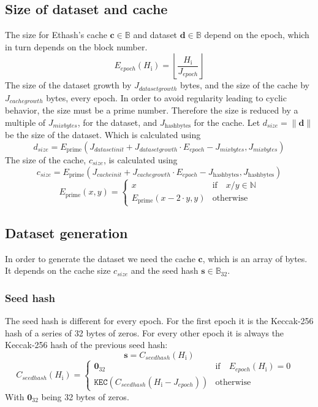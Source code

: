 \documentclass[9pt,oneside]{amsart}
\makeatletter
\newcommand{\linkdest}[1]{\Hy@raisedlink{\hypertarget{#1}{}}}
\makeatother
\begin{document}
\subsection{Size of dataset and cache}
The size for Ethash's cache $\mathbf{c} \in \mathbb{B}$  and dataset $\mathbf{d} \in \mathbb{B}$ depend on the epoch, which in turn depends on the block number.
\begin{equation}
 E_{epoch}(H_{\mathrm{i}}) = \left\lfloor\frac{H_{\mathrm{i}}}{J_{epoch}}\right\rfloor
\end{equation}
The size of the dataset growth by $J_{datasetgrowth}$ bytes, and the size of the cache by $J_{cachegrowth}$ bytes, every epoch. In order to avoid regularity leading to cyclic behavior, the size must be a prime number. Therefore the size is reduced by a multiple of $J_{mixbytes}$, for the dataset, and $J_{\mathrm{hashbytes}}$ for the cache.
\linkdest{d__size}{}Let $d_{size} = \lVert \mathbf{d} \rVert$ be the size of the dataset. Which is calculated using
\begin{equation}
 d_{size} = E_{\mathrm{prime}}(J_{datasetinit} + J_{datasetgrowth} \cdot E_{epoch} - J_{mixbytes}, J_{mixbytes})
\end{equation}
The size of the cache, $c_{size}$, is calculated using
\begin{equation}
 c_{size} = E_{\mathrm{prime}}(J_{cacheinit} + J_{cachegrowth} \cdot E_{epoch} - J_{\mathrm{hashbytes}}, J_{\mathrm{hashbytes}})
\end{equation}
\begin{equation}
 E_{\mathrm{prime}}(x, y) = \begin{cases}
x & \text{if} \quad x / y \in \mathbb{N} \\
E_{\mathrm{prime}}(x - 2 \cdot y, y) & \text{otherwise}
\end{cases}
\end{equation}
\subsection{Dataset generation}
In order to generate the dataset we need the cache $\mathbf{c}$, which is an array of bytes. It depends on the cache size  $c_{size}$ and the seed hash $\mathbf{s} \in \mathbb{B}_{32}$.
\subsubsection{Seed hash}
The seed hash is different for every epoch. For the first epoch it is the Keccak-256 hash of a series of 32 bytes of zeros. For every other epoch it is always the Keccak-256 hash of the previous seed hash:
\begin{equation}
 \mathbf{s} = C_{seedhash}(H_{\mathrm{i}})
\end{equation}
\begin{equation}
 C_{seedhash}(H_{\mathrm{i}}) = \begin{cases}
\mathbf{0}_{32} & \text{if} \quad E_{epoch}(H_{\mathrm{i}}) = 0 \quad  \\
\texttt{KEC}(C_{seedhash}(H_{\mathrm{i}} - J_{epoch})) & \text{otherwise}
\end{cases}
\end{equation}
With $\mathbf{0}_{32}$ being 32 bytes of zeros.
\end{document}
